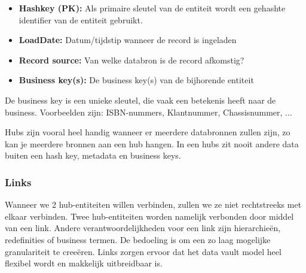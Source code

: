 \begin{itemize}
	\item \textbf{Hashkey (PK):} Als primaire sleutel van de entiteit wordt een gehashte identifier van de entiteit gebruikt.
	\item \textbf{LoadDate:} Datum/tijdstip wanneer de record is ingeladen
	\item \textbf{Record source:} Van welke databron is de record afkomstig?
	\item \textbf{Business key(s):} De business key(s) van de bijhorende entiteit
\end{itemize} 

 De business key is een unieke sleutel, die vaak een betekenis heeft naar de business. Voorbeelden zijn: ISBN-nummers, Klantnummer, Chassisnummer, ...
 
 Hubs zijn vooral heel handig wanneer er meerdere databronnen zullen zijn, zo kan je meerdere bronnen aan een hub hangen. In een hubs zit nooit andere data buiten een hash key, metadata en business keys.

\subsubsection{Links}
Wanneer we 2 hub-entiteiten willen verbinden, zullen we ze niet rechtstreeks met elkaar verbinden. Twee hub-entiteiten worden namelijk verbonden door middel van een link. Andere verantwoordelijkheden voor een link zijn hierarchieën, redefinities of business termen. De bedoeling is om een zo laag mogelijke granulariteit te creeëren. Links zorgen ervoor dat het data vault model heel flexibel wordt en makkelijk uitbreidbaar is. 


